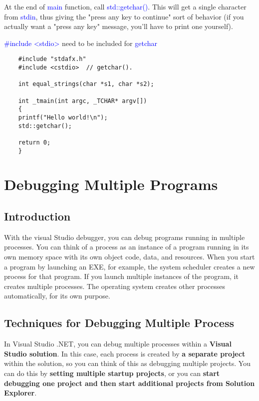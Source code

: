 	At the end of \textcolor{blue}{main} function, call \textcolor{blue}{std::getchar()}. This will get a single character from \textcolor{blue}{stdin}, thus giving the "press any key to continue" sort of behavior (if you actually want a "press any key" message, you'll have to print one yourself).
	
	\textcolor{blue}{\#include <stdio>} need to be included for \textcolor{blue}{getchar}
	
	\begin{verbatim}
	#include "stdafx.h"
	#include <cstdio>  // getchar().
	
	int equal_strings(char *s1, char *s2);
	
	int _tmain(int argc, _TCHAR* argv[])
	{
	printf("Hello world!\n");
	std::getchar();
	
	return 0;
	}	
	\end{verbatim}
	
	\section{Debugging Multiple Programs}
	\subsection{Introduction}
	With the visual Studio debugger, you can debug programs running in multiple processes. You can think of a process as an instance of a program running in its own memory space with its own object code, data, and resources. When you start a program by launching an EXE, for example, the system scheduler creates a new process for that program. If you launch multiple instances of the program, it creates multiple processes. The operating system creates other processes automatically, for its own purpose.\\
	
	\subsection{Techniques for Debugging Multiple Process}
	In Visual Studio .NET, you can debug multiple processes within a \textbf{Visual Studio solution}. In this case, each process is created by \textbf{a separate project} within the solution, so you can think of this as debugging multiple projects. You can do this by \textbf{setting multiple startup projects}, or you can \textbf{start debugging one project and then start additional projects from Solution Explorer}.\\
	
